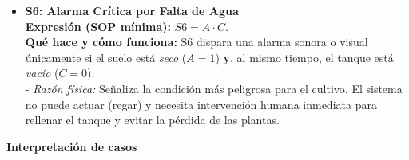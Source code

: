 \begin{itemize}
    \item \textbf{S6: Alarma Crítica por Falta de Agua}\\
    \textbf{Expresión (SOP mínima):} \(\displaystyle S6 = A \cdot \overline{C}\).\\
    \textbf{Qué hace y cómo funciona:} S6 dispara una alarma sonora o visual únicamente si el suelo está \emph{seco} ($A=1$) \textbf{y}, al mismo tiempo, el tanque está \emph{vacío} ($C=0$).\\
    - \emph{Razón física:} Señaliza la condición más peligrosa para el cultivo. El sistema no puede actuar (regar) y necesita intervención humana inmediata para rellenar el tanque y evitar la pérdida de las plantas.
\end{itemize}


\textbf{Interpretación de casos}


